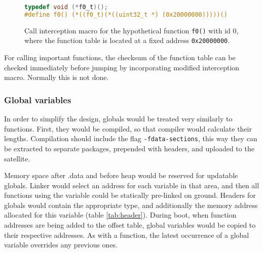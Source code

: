 \begin{figure} [htb]
\begin{lstlisting}[language=C]
typedef void (*f0_t)();
#define f0() (*((f0_t)(*((uint32_t *) (0x20000000)))))()
\end{lstlisting}
\caption{Call interception macro for the hypothetical function \texttt{f0()} with id $0$, \\where the function table is located at a fixed address \texttt{0x20000000}.}
\label{fig:macro}
\end{figure}

For calling important functions, the checksum of the function table can be checked immediately before jumping by incorporating modified interception macro. Normally this is not done.

\subsubsection{Global variables}

In order to simplify the design, globals would be treated very similarly to functions. First, they would be compiled, so that compiler would calculate their lengths. Compilation should include the flag \texttt{-fdata-sections}, this way they can be extracted to separate packages, prepended with headers, and uploaded to the satellite.

Memory space after .data and before heap would be reserved for updatable globals. Linker would select an address for each variable in that area, and then all functions using the variable could be statically pre-linked on ground. Headers for globals would contain the appropriate type, and additionally the memory address allocated for this variable (table \ref{tab:header}). During boot, when function addresses are being added to the offset table, global variables would be copied to their respective addresses. As with a function, the latest occurrence of a global variable overrides any previous ones.


